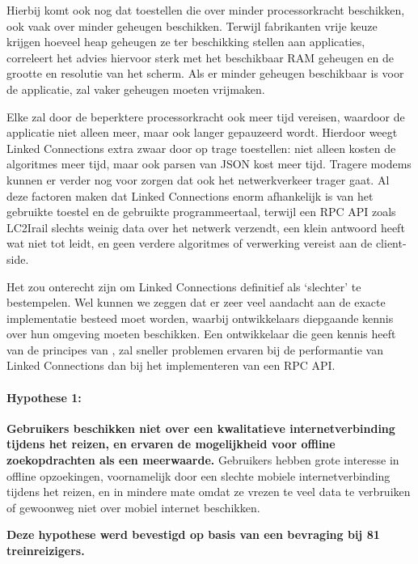 Hierbij komt ook nog dat toestellen die over minder processorkracht beschikken, ook vaak over minder geheugen beschikken. Terwijl fabrikanten vrije keuze krijgen hoeveel heap geheugen ze ter beschikking stellen aan applicaties, correleert het advies hiervoor sterk met het beschikbaar RAM geheugen en de grootte en resolutie van het scherm. Als er minder geheugen beschikbaar is voor de applicatie, zal  vaker geheugen moeten vrijmaken. 

Elke  zal door de beperktere processorkracht ook meer tijd vereisen, waardoor de applicatie niet alleen meer, maar ook langer gepauzeerd wordt. Hierdoor weegt Linked Connections extra zwaar door op trage toestellen: niet alleen kosten de algoritmes meer tijd, maar ook parsen van JSON kost meer tijd. Tragere modems kunnen er verder nog voor zorgen dat ook het netwerkverkeer trager gaat. Al deze factoren maken dat Linked Connections enorm afhankelijk is van het gebruikte toestel en de gebruikte programmeertaal, terwijl een RPC API zoals LC2Irail slechts weinig data over het netwerk verzendt, een klein antwoord heeft wat niet tot  leidt, en geen verdere algoritmes of verwerking vereist aan de client-side. 

Het zou onterecht zijn om Linked Connections definitief als `slechter' te bestempelen. Wel kunnen we zeggen dat er zeer veel aandacht aan de exacte implementatie besteed moet worden, waarbij ontwikkelaars diepgaande kennis over hun omgeving moeten beschikken. Een ontwikkelaar die geen kennis heeft van de principes van , zal sneller problemen ervaren bij de performantie van Linked Connections dan bij het implementeren van een RPC API.

\paragraph{Hypothese 1:} \textbf{Gebruikers beschikken niet over een kwalitatieve internetverbinding tijdens het reizen, en ervaren de mogelijkheid voor offline zoekopdrachten als een meerwaarde.}
	Gebruikers hebben grote interesse in offline opzoekingen, voornamelijk door een slechte mobiele internetverbinding tijdens het reizen, en in mindere mate omdat ze vrezen te veel data te verbruiken of gewoonweg niet over mobiel internet beschikken.
	
\textbf{Deze hypothese werd bevestigd op basis van een bevraging bij 81 treinreizigers.}

